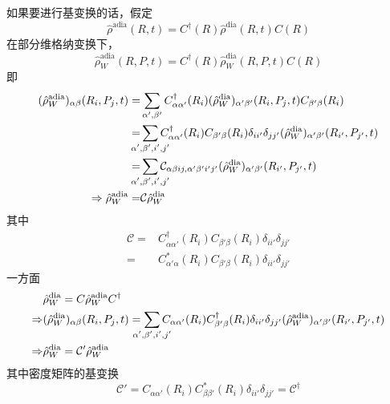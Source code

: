 \documentclass[UTF8,12pt]{article}
\begin{document}
        如果要进行基变换的话，假定
        \begin{equation}
            \hat{\rho}^{\mathrm{adia}}(R,t)=C^\dagger(R)\hat{\rho}^{\mathrm{dia}}(R,t)C(R)
        \end{equation}
        在部分维格纳变换下，
        \begin{equation}
            \hat{\rho}_W^{\mathrm{adia}}(R,P,t)=C^\dagger(R)\hat{\rho}_W^{\mathrm{dia}}(R,P,t)C(R)
        \end{equation}
        即
        \begin{align}
            (\hat{\rho}_W^{\mathrm{adia}})_{\alpha\beta}(R_i,P_j,t)=&\sum_{\alpha',\beta'}{C^\dagger_{\alpha\alpha'}(R_i)(\hat{\rho}_W^{\mathrm{dia}})_{\alpha'\beta'}(R_i,P_j,t)C_{\beta'\beta}(R_i)} \\
            =&\sum_{\mathclap{\alpha',\beta',i',j'}}{C^\dagger_{\alpha\alpha'}(R_i)C_{\beta'\beta}(R_i)\delta_{ii'}\delta_{jj'}(\hat{\rho}_W^{\mathrm{dia}})_{\alpha'\beta'}(R_{i'},P_{j'},t)} \\
            =&\sum_{\mathclap{\alpha',\beta',i',j'}}{\mathcal{C}_{\alpha\beta ij,\alpha'\beta'i'j'}(\hat{\rho}_W^{\mathrm{dia}})_{\alpha'\beta'}(R_{i'},P_{j'},t)} \\
            \Rightarrow\hat{\rho}_W^{\mathrm{adia}}=&\mathcal{C}\hat{\rho}_W^{\mathrm{dia}}
        \end{align}
        其中
        \begin{align}
            \mathcal{C}=&C^\dagger_{\alpha\alpha'}(R_i)C_{\beta'\beta}(R_i)\delta_{ii'}\delta_{jj'} \\
            =&C_{\alpha'\alpha}^*(R_i)C_{\beta'\beta}(R_i)\delta_{ii'}\delta_{jj'}
        \end{align}
        一方面
        \begin{align}
            &\hat{\rho}_W^{\mathrm{dia}}=C\hat{\rho}_W^{\mathrm{adia}}C^\dagger \\
            \Rightarrow&(\hat{\rho}_W^{\mathrm{dia}})_{\alpha\beta}(R_i,P_j,t)=\sum_{\mathclap{\alpha',\beta',i',j'}}{C_{\alpha\alpha'}(R_i)C^\dagger_{\beta'\beta}(R_i)\delta_{ii'}\delta_{jj'}(\hat{\rho}_W^{\mathrm{adia}})_{\alpha'\beta'}(R_{i'},P_{j'},t)} \\
            \Rightarrow&\hat{\rho}_W^{\mathrm{dia}}=\mathcal{C}'\hat{\rho}_W^{\mathrm{adia}}
        \end{align}
        其中密度矩阵的基变换
        \begin{equation}
            \mathcal{C}'=C_{\alpha\alpha'}(R_i)C^*_{\beta\beta'}(R_i)\delta_{ii'}\delta_{jj'}=\mathcal{C}^\dagger
        \end{equation}
\end{document}
